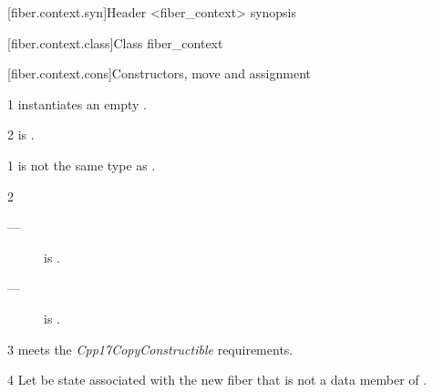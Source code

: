 
[fiber.context.syn]{Header <fiber\_context> synopsis}


[fiber.context.class]{Class fiber\_context}


\newcommand{\state}{\cpp{state}}

[fiber.context.cons]{Constructors, move and assignment}
\label{constructor}

1 \effects instantiates an empty \fiber.

2 \postcond
\emptyfn is \true.


1 \constraints
{} is not the same type as \fiber.

2 \mandates
\begin{description}
    \item[---]  is \true.
    \item[---]  is \true.
\end{description}

3 \precond
{} meets the \emph{Cpp17CopyConstructible} requirements.

4 Let  be state associated with the new fiber
that is not a data member of \fiber. 

